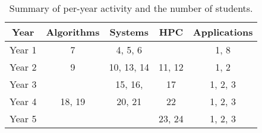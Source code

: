 \begin{table}
\centering
\begin{tabular}{|c|c|c|c|c|}
  \toprule
  {\bf Year} & {\bf Algorithms} & {\bf Systems} & {\bf HPC}  & {\bf Applications}\\
  \midrule
  Year 1 & 7 & 4, 5, 6 & & 1, 8 \\
  Year 2 & 9 & 10, 13, 14 & 11, 12 & 1, 2 \\
  Year 3 &  & 15, 16,  & 17 & 1, 2, 3 \\
  Year 4 & 18, 19 & 20, 21 & 22 & 1, 2, 3 \\
  Year 5 &  & & 23, 24 & 1, 2, 3 \\
  \bottomrule
\end{tabular}
\caption{Summary of per-year activity and the number of students.}
\label{tab:timneline}
\vspace{-0.3cm}
\end{table}


\iffalse
{}

